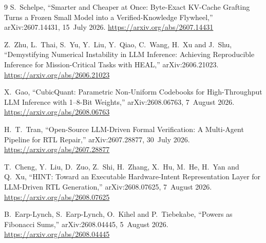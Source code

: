 \documentclass[11pt]{article}
\theoremstyle{definition}
\begin{document}
\begin{thebibliography}{9}
 S.~Schelpe, ``Smarter and Cheaper at Once: Byte-Exact KV-Cache Grafting Turns a Frozen Small Model into a Verified-Knowledge Flywheel,'' arXiv:2607.14431, 15~July 2026. \url{https://arxiv.org/abs/2607.14431}

 Z.~Zhu, L.~Thai, S.~Yu, Y.~Liu, Y.~Qiao, C.~Wang, H.~Xu and J.~Shu, ``Demystifying Numerical Instability in LLM Inference: Achieving Reproducible Inference for Mission-Critical Tasks with HEAL,'' arXiv:2606.21023. \url{https://arxiv.org/abs/2606.21023}

 X.~Gao, ``CubicQuant: Parametric Non-Uniform Codebooks for High-Throughput LLM Inference with 1--8-Bit Weights,'' arXiv:2608.06763, 7~August 2026. \url{https://arxiv.org/abs/2608.06763}

 H.~T.~Tran, ``Open-Source LLM-Driven Formal Verification: A Multi-Agent Pipeline for RTL Repair,'' arXiv:2607.28877, 30~July 2026. \url{https://arxiv.org/abs/2607.28877}

 T.~Cheng, Y.~Liu, D.~Zuo, Z.~Shi, H.~Zhang, X.~Hu,
M.~He, H.~Yan and Q.~Xu, ``HINT: Toward an Executable Hardware-Intent
Representation Layer for LLM-Driven RTL Generation,'' arXiv:2608.07625, 7~August
2026. \url{https://arxiv.org/abs/2608.07625}

 B.~Earp-Lynch, S.~Earp-Lynch, O.~Kihel and P.~Tiebekabe, ``Powers as Fibonacci Sums,'' arXiv:2608.04445, 5~August 2026. \url{https://arxiv.org/abs/2608.04445}

\end{thebibliography}
\end{document}
